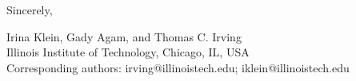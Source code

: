 \documentclass[11pt]{article}
\begin{document}
\vspace{1.0em}
\noindent Sincerely,

\vspace{1.0em}
\noindent Irina Klein, Gady Agam, and Thomas C. Irving\\
Illinois Institute of Technology, Chicago, IL, USA\\
Corresponding authors: irving@illinoistech.edu; iklein@illinoistech.edu
\end{document}
